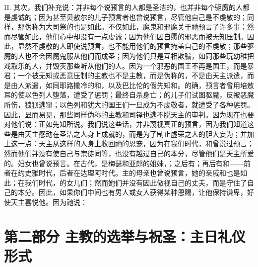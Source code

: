 II. 其次，我们补充说：并非每个说预言的人都是圣洁的，也并非每个驱魔的人都是虔诚的；因为甚至贝敖尔的儿子预言者也曾说预言，尽管他自己是不虔敬的；同样，那伪称为大司祭的也是如此。不仅如此，魔鬼和邪魔关于祂预言了许多事；然而尽管如此，他们心中却没有一点虔诚；因为他们因自愿的邪恶而被无知压制。因此，显然不虔敬的人即使说预言，也不能用他们的预言掩盖自己的不虔敬；那些驱魔的人也不会因魔鬼服从他们而成圣；因为他们只是互相欺骗，如同那些玩幼稚把戏取乐的人，并毁灭那些听从他们的人。因为一个邪恶的国王不再是国王，而是暴君；一个被无知或恶意压制的主教也不是主教，而是伪称的，不是由天主派遣，而是由人派遣，如同耶路撒冷的和，以及巴比伦的假先知和。的确，预言者曾用培敖耳的使以色列人堕落，遭受了惩罚；最终自杀身亡；的儿子们试图驱魔，反被恶魔所伤，狼狈逃窜；以色列和犹大的国王们一旦成为不虔敬者，就遭受了各种惩罚。因此，显而易见，那些同样伪称的主教和司铎也逃不脱天主的审判。因为现在也要对他们说：正如先知所说。我们说这些话，并非蔑视真正的预言，因为我们知道这些是由天主感动在圣洁之人身上成就的，而是为了制止虚荣之人的胆大妄为；并加上这一点：天主从这样的人身上收回祂的恩宠，因为在我们时代，和曾说过预言；然而他们并没有使自己与宗徒同等，也没有越过自己的本分，尽管他们是天主所爱的。妇女也曾说预言。在古代，是梅瑟和亚郎的姐妹，；之后有；再后有和——前者在约史雅时代，后者在达理阿时代。主的母亲也曾说预言，她的亲戚和也是如此；在我们时代，的女儿们；然而她们并没有因此傲视自己的丈夫，而是守住了自己的本分。因此，如果你们中间也有男人或女人获得某种恩赐，让他保持谦卑，好使天主喜悦他。因为祂说：\par


\section{第二部分 主教的选举与祝圣：主日礼仪形式}


